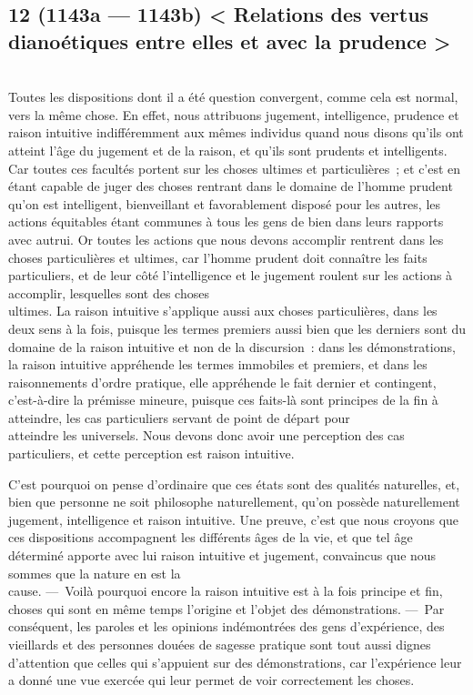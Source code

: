 \documentclass[french,twoside]{book} %
\begin{document}
\subsection[{12 (1143a — 1143b) < Relations des vertus dianoétiques entre elles et avec la prudence >}]{12 (1143a — 1143b) < Relations des vertus dianoétiques entre elles et avec la prudence >}
\noindent \\
Toutes les dispositions dont il a été question convergent, comme cela est normal, vers la même chose. En effet, nous attribuons jugement, intelligence, prudence et raison intuitive indifféremment aux mêmes individus quand nous disons qu’ils ont atteint l’âge du jugement et de la raison, et qu’ils sont prudents et intelligents. Car toutes ces facultés portent sur les choses ultimes et particulières ; et c’est en étant capable de juger des choses rentrant dans le domaine de l’homme prudent \\
qu’on est intelligent, bienveillant et favorablement disposé pour les autres, les actions équitables étant communes à tous les gens de bien dans leurs rapports avec autrui. Or toutes les actions que nous devons accomplir rentrent dans les choses particulières et ultimes, car l’homme prudent doit connaître les faits particuliers, et de leur côté l’intelligence et le jugement roulent sur les actions à accomplir, lesquelles sont des choses \\
ultimes. La raison intuitive s’applique aussi aux choses particulières, dans les deux sens à la fois, puisque les termes premiers aussi bien que les derniers sont du domaine de la  raison intuitive et non de la discursion : dans les démonstrations, la raison intuitive appréhende les termes immobiles et premiers, et dans les raisonnements d’ordre pratique, elle appréhende le fait dernier et contingent, c’est-à-dire la prémisse mineure, puisque ces faits-là sont principes de la fin à atteindre, les cas particuliers servant de point de départ pour \\
atteindre les universels. Nous devons donc avoir une perception des cas particuliers, et cette perception est raison intuitive.\par
C’est pourquoi on pense d’ordinaire que ces états sont des qualités naturelles, et, bien que personne ne soit philosophe naturellement, qu’on possède naturellement jugement, intelligence et raison intuitive. Une preuve, c’est que nous croyons que ces dispositions accompagnent les différents âges de la vie, et que tel âge déterminé apporte avec lui raison intuitive et jugement, convaincus que nous sommes que la nature en est la \\
cause. — Voilà pourquoi encore la raison intuitive est à la fois principe et fin, choses qui sont en même temps l’origine et l’objet des démonstrations. — Par conséquent, les paroles et les opinions indémontrées des gens d’expérience, des vieillards et des personnes douées de sagesse pratique sont tout aussi dignes d’attention que celles qui s’appuient sur des démonstrations, car l’expérience leur a donné une vue exercée qui leur permet de voir correctement les choses.
\end{document}

